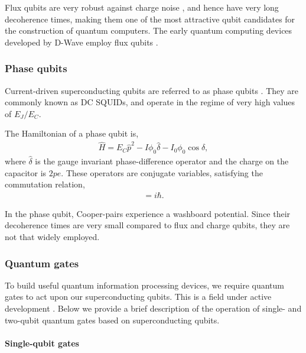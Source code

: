 Flux qubits are very robust against charge noise \cite{bib:you2005fast}, and hence have very long decoherence times, making them one of the most attractive qubit candidates for the construction of quantum computers. The early quantum computing devices developed by D-Wave employ flux qubits \cite{bib:harris2018phase}.

\subsubsection{Phase qubits}

Current-driven superconducting qubits are referred to as phase qubits \cite{bib:martinis2002rabi}. They are commonly known as DC SQUIDs, and operate in the regime of very high values of $E_{J}/E_{C}$.

The Hamiltonian of a phase qubit is,
\begin{align}
\hat{H} = E_{C} \hat{p}^{2} - I \phi_{0} \hat\delta - I_{0} \phi_{0} \cos \hat\delta,
\label{eq:phase_qubit_hamiltonian}
\end{align}
where $\hat\delta$ is the gauge invariant phase-difference operator and the charge on the capacitor is $2pe$. These operators are conjugate variables, satisfying the commutation relation,
\begin{align}
	[\hat\delta, \hat{p}] = i \hbar.
\end{align}

In the phase qubit, Cooper-pairs experience a washboard potential. Since their decoherence times are very small compared to flux and charge qubits, they are not that widely employed.

\subsubsection{Quantum gates}

To build useful quantum information processing devices, we require quantum gates to act upon our superconducting qubits. This is a field under active development \cite{bib:blais2004cavity, bib:chow2011simple, bib:chow2013microwave}. Below we provide a brief description of the operation of single- and two-qubit quantum gates based on superconducting qubits.

\paragraph{Single-qubit gates}

